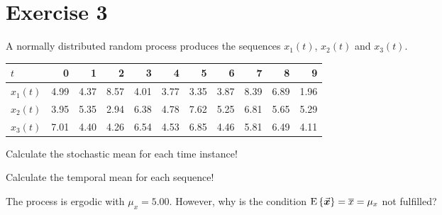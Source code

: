 %
%
%

{}
\section*{Exercise 3}

\begin{question}[subtitle={Stochastic Process}]
	A normally distributed random process produces the sequences $x_1(t)$, $x_2(t)$ and $x_3(t)$.
	\begin{table}[H]
		\centering
		\begin{tabular}{|l|r|r|r|r|r|r|r|r|r|r|}
			\hline
			$t$ & 0 & 1 & 2 & 3 & 4 & 5 & 6 & 7 & 8 & 9 \\
			\hline
			\hline
			$x_1(t)$ & 4.99 & 4.37 & 8.57 & 4.01 & 3.77 & 3.35 & 3.87 & 8.39 & 6.89 & 1.96 \\
			\hline
			$x_2(t)$ & 3.95 & 5.35 & 2.94 & 6.38 & 4.78 & 7.62 & 5.25 & 6.81 & 5.65 & 5.29 \\
			\hline
			$x_3(t)$ & 7.01 & 4.40 & 4.26 & 6.54 & 4.53 & 6.85 & 4.46 & 5.81 & 6.49 & 4.11 \\
			\hline
		\end{tabular}
	\end{table}
	\begin{tasks}
		\task
		Calculate the stochastic mean for each time instance!
		
		\task
		Calculate the temporal mean for each sequence!
		
		\task
		The process is ergodic with $\mu_x = 5.00$. However, why is the condition $\mathrm{E}\left\{\vec{\bm{x}}\right\} = \overline{x} = \mu_x$ not fulfilled?
	\end{tasks}
\end{question}

